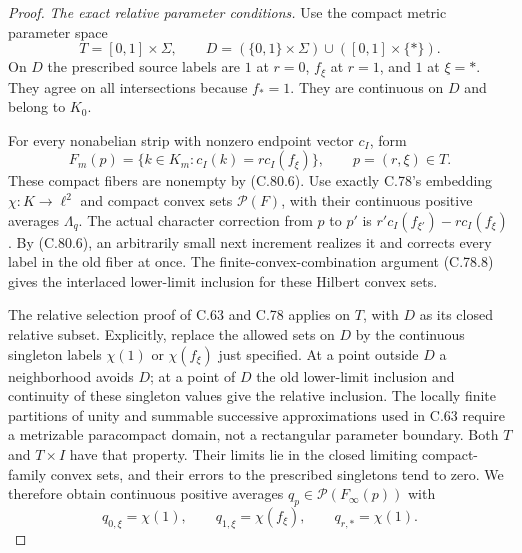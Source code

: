 \begin{proof}
\emph{The exact relative parameter conditions.}
Use the compact metric parameter space
\[
 T=[0,1]\times\Sigma,\qquad
 D=(\{0,1\}\times\Sigma)\cup([0,1]\times\{*\}).
                                                               \tag{C.80.7}
\]
On $D$ the prescribed source labels are $1$
at $r=0$, $f_\xi$ at $r=1$, and $1$ at $\xi=*$.
They agree on all intersections because $f_*=1$.
They are continuous on $D$ and belong to $K_0$.

For every nonabelian strip with nonzero endpoint
vector $c_I$, form
\[
 F_m(p)=\{k\in K_m:c_I(k)=r c_I(f_\xi)\},
 \qquad p=(r,\xi)\in T.
                                                               \tag{C.80.8}
\]
These compact fibers are nonempty by (C.80.6).
Use exactly C.78's embedding $\chi:K\to\ell^2$
and compact convex sets $\mathcal P(F)$, with
their continuous positive averages $\Lambda_q$.
The actual character correction from $p$ to
$p'$ is $r'c_I(f_{\xi'})-r c_I(f_\xi)$. By
(C.80.6), an arbitrarily small next increment
realizes it and corrects every label in the
old fiber at once. The finite-convex-combination
argument (C.78.8) gives the interlaced lower-limit
inclusion for these Hilbert convex sets.

The relative selection proof of C.63 and C.78
applies on $T$, with $D$ as its closed relative
subset. Explicitly, replace the allowed sets
on $D$ by the continuous singleton labels
$\chi(1)$ or $\chi(f_\xi)$ just specified.
At a point outside $D$ a neighborhood avoids
$D$; at a point of $D$ the old lower-limit
inclusion and continuity of these singleton
values give the relative inclusion. The
locally finite partitions of unity and
summable successive approximations used in
C.63 require a metrizable paracompact domain,
not a rectangular parameter boundary. Both
$T$ and $T\times I$ have that property.
Their limits lie in the closed limiting
compact-family convex sets, and their errors
to the prescribed singletons tend to zero.
We therefore obtain continuous positive
averages $q_p\in\mathcal P(F_\infty(p))$ with
\[
 q_{0,\xi}=\chi(1),\qquad q_{1,\xi}=\chi(f_\xi),
                       \qquad q_{r,*}=\chi(1).
                                                               \tag{C.80.9}
\]


\end{proof}
